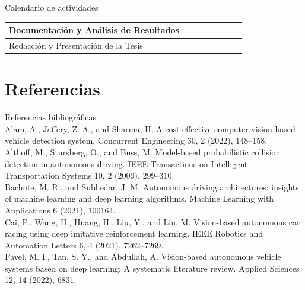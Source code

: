 \documentclass[8pt]{beamer}
\begin{document}
\begin{frame}{Calendario de actividades}
\begin{center}
\begin{tabular}{|p{2cm}|p{0.1cm}|p{0.1cm}|p{0.1cm}|p{0.1cm}|p{0.1cm}|p{0.1cm}|p{0.1cm}|}
                \hline
                Documentación y Análisis de Resultados      &                                   &                                     &                                     &                                 &                                   &                                 & \cellcolor{gray!30}             \\
                \hline
                Redacción y Presentación de la Tesis        &                                   &                                     &                                     &                                 &                                   &                                 & \cellcolor{gray!30}             \\
                \hline
            \end{tabular}
        \end{center}
    
    \end{frame}
    
    
    \section{Referencias}
    \begin{frame}{Referencias bibliográficas}
        \\[1] Alam, A., Jaffery, Z. A., and Sharma, H. A cost-effective computer vision-based vehicle
        detection system. Concurrent Engineering 30, 2 (2022), 148–158.
        \\[2] Althoff, M., Stursberg, O., and Buss, M. Model-based probabilistic collision detection in
        autonomous driving. IEEE Transactions on Intelligent Transportation Systems 10, 2 (2009),
        299–310.
        \\[3] Bachute, M. R., and Subhedar, J. M. Autonomous driving architectures: insights of
        machine learning and deep learning algorithms. Machine Learning with Applications 6
        (2021), 100164.
        \\[4] Cai, P., Wang, H., Huang, H., Liu, Y., and Liu, M. Vision-based autonomous car racing
        using deep imitative reinforcement learning. IEEE Robotics and Automation Letters 6, 4
        (2021), 7262–7269.
        \\[5] Pavel, M. I., Tan, S. Y., and Abdullah, A. Vision-based autonomous vehicle systems
        based on deep learning: A systematic literature review. Applied Sciences 12, 14 (2022),
        6831.
    
    \end{frame}
\end{document}
